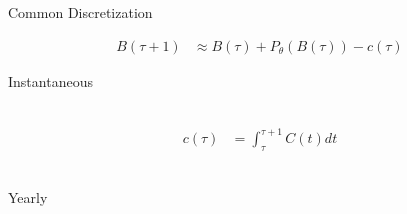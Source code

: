 \documentclass[ xcolor = pdftex, dvipsnames, table ]{beamer}
\begin{document}
\begin{frame}{Common Discretization}
{\begin{minipage}[h!]{0.64\textwidth}
\begin{align*}
B(\tau+1) &\approx B(\tau) + P_\theta(B(\tau)) - c(\tau)
\end{align*}
\end{minipage}
\begin{minipage}[h!]{0.24\textwidth}
\begin{center}
Instantaneous
\end{center}
$~$\\ 
\begin{align*}
c(\tau) &= \int_\tau^{\tau+1} C(t)dt
\end{align*}
$~$\\
\begin{center}
Yearly
\end{center}
\vspace*{-5cm}
\hspace*{-2cm}
\end{minipage}
}
\end{frame}
\end{document}

